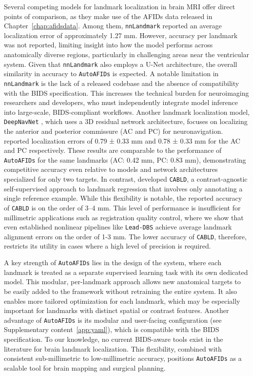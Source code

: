 Several competing models for landmark localization in brain MRI offer direct points of comparison, as they make use of the AFIDs data released in Chapter~\ref{chap:afidsdata}. Among them, \texttt{nnLandmark} \cite{Ertl2025-wu} reported an average localization error of approximately 1.27 mm. However, accuracy per landmark was not reported, limiting insight into how the model performs across anatomically diverse regions, particularly in challenging areas near the ventricular system. Given that \texttt{nnLandmark} also employs a U-Net architecture, the overall similarity in accuracy to \texttt{AutoAFIDs} is expected. A notable limitation in \texttt{nnLandmark} is the lack of a released codebase and the absence of compatibility with the BIDS specification. This increases the technical burden for neuroimaging researchers and developers, who must independently integrate model inference into large-scale, BIDS-compliant workflows. Another landmark localization model, \texttt{DeepNavNet} \cite{Edwards2021-su}, which uses a 3D residual network architecture, focuses on localizing the anterior and posterior commissure (AC and PC) for neuronavigation. \cite{Edwards2021-su} reported localization errors of 0.79 ± 0.33 mm and 0.78 ± 0.33 mm for the AC and PC respectively. These results are comparable to the performance of \texttt{AutoAFIDs} for the same landmarks (AC: 0.42 mm, PC: 0.83 mm), demonstrating competitive accuracy even relative to models and network architectures specialized for only two targets. In contrast, \cite{Salari2024-iu} developed \texttt{CABLD}, a contrast-agnostic self-supervised approach to landmark regression that involves only annotating a single reference example. While this flexibility is notable, the reported accuracy of \texttt{CABLD} is on the order of 3–4 mm. This level of performance is insufficient for millimetric applications such as registration quality control, where we show that even established nonlinear pipelines like \texttt{Lead-DBS} achieve average landmark alignment errors on the order of 1-3 mm. The lower accuracy of \texttt{CABLD}, therefore, restricts its utility in cases where a high level of precision is required.

A key strength of \texttt{AutoAFIDs} lies in the design of the system, where each landmark is treated as a separate supervised learning task with its own dedicated model. This modular, per-landmark approach allows new anatomical targets to be easily added to the framework without retraining the entire system. It also enables more tailored optimization for each landmark, which may be especially important for landmarks with distinct spatial or contrast features. Another advantage of \texttt{AutoAFIDs} is its modular and user-facing configuration (see Supplementary content~\ref{app:yaml}), which is compatible with the BIDS specification. To our knowledge, no current BIDS-aware tools exist in the literature for brain landmark localization. This flexibility, combined with consistent sub-millimetric to low-millimetric accuracy, positions \texttt{AutoAFIDs} as a scalable tool for brain mapping and surgical planning.

